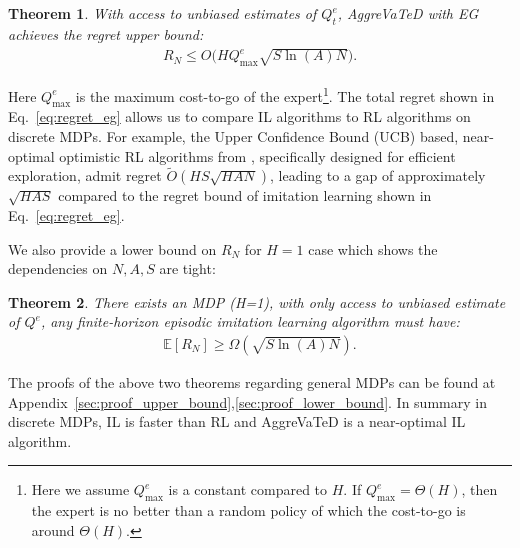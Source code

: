 \documentclass{article}
\newtheorem{theorem}{Theorem}[section]
\begin{document}
\begin{theorem}
\label{them:upper_bound}
With access to unbiased estimates of $Q^e_t$, AggreVaTeD with EG achieves the regret upper bound:
\begin{align}
\label{eq:regret_eg}
R_N \leq O\big(HQ_{\max}^e\sqrt{S\ln(A)N}\big).
\end{align}
\end{theorem} Here $Q_{\max}^e$ is the maximum cost-to-go of the expert\footnote{Here we assume $Q_{\max}^e$ is a constant compared to $H$. If $Q_{\max}^e=\Theta(H)$, then the expert is no better than a random policy of which the cost-to-go is around $\Theta(H)$.}. 
The total regret shown in Eq.~\ref{eq:regret_eg} allows us to compare IL algorithms to RL algorithms on discrete MDPs. For example, the Upper Confidence Bound (UCB) based, near-optimal optimistic RL algorithms from \cite{jaksch2010near}, specifically designed for efficient exploration, admit regret $\tilde{O}(HS\sqrt{H AN})$, leading to a gap of approximately $\sqrt{HAS}$ compared to the regret bound of imitation learning shown in Eq.~\ref{eq:regret_eg}. 

We also provide a lower bound on $R_N$ for $H=1$ case which shows the dependencies on $N, A, S$ are tight:
\begin{theorem}
\label{them:lower_bound}
There exists an MDP (H=1), with only access to unbiased estimate of $Q^e$, any finite-horizon episodic imitation learning algorithm  must have:
\begin{align}
\mathbb{E}[R_N] \geq \Omega(\sqrt{S\ln({A})N}).
\end{align}
\end{theorem} The proofs of the above two theorems regarding general MDPs can be found at Appendix~\ref{sec:proof_upper_bound},\ref{sec:proof_lower_bound}. In summary in discrete MDPs, IL is faster than RL and AggreVaTeD is a near-optimal IL algorithm.
\end{document}
